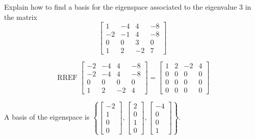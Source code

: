 
\begin{exerciseStatement}


Explain how to find a basis for the eigenspace associated to the eigenvalue \( 3 \) in the matrix \[ \left[\begin{array}{cccc}
1 & -4 & 4 & -8 \\
-2 & -1 & 4 & -8 \\
0 & 0 & 3 & 0 \\
1 & 2 & -2 & 7
\end{array}\right] \]


\end{exerciseStatement}
    
\begin{exerciseAnswer} 


\[\operatorname{RREF} \left[\begin{array}{cccc}
-2 & -4 & 4 & -8 \\
-2 & -4 & 4 & -8 \\
0 & 0 & 0 & 0 \\
1 & 2 & -2 & 4
\end{array}\right] = \left[\begin{array}{cccc}
1 & 2 & -2 & 4 \\
0 & 0 & 0 & 0 \\
0 & 0 & 0 & 0 \\
0 & 0 & 0 & 0
\end{array}\right] \]



A basis of the eigenspace is \( \left\{ \left[\begin{array}{c}
-2 \\
1 \\
0 \\
0
\end{array}\right] , \left[\begin{array}{c}
2 \\
0 \\
1 \\
0
\end{array}\right] , \left[\begin{array}{c}
-4 \\
0 \\
0 \\
1
\end{array}\right] \right\} \).


\end{exerciseAnswer}
    

